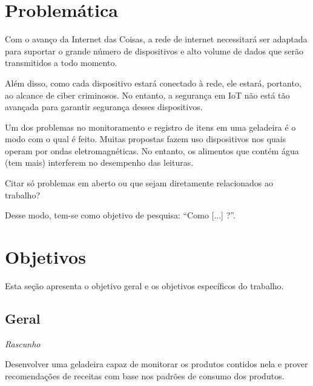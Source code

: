 \section{Problemática}

Com o avanço da Internet das Coisas, a rede de internet necessitará ser adaptada para suportar o grande número de dispositivos e alto volume de dados que serão transmitidos a todo momento.

Além disso, como cada dispositivo estará conectado à rede, ele estará, portanto, ao alcance de ciber criminosos. No entanto, a segurança em IoT não está tão avançada para garantir segurança desses dispositivos.

Um dos problemas no monitoramento e registro de itens em uma geladeira é o modo com o qual é feito. Muitas propostas fazem uso dispositivos nos quais operam por ondas eletromagnéticas. No entanto, os alimentos que contém água (tem mais) interferem no desempenho das leituras.

Citar só problemas em aberto ou que sejam diretamente relacionados ao trabalho?


Desse modo, tem-se como objetivo de pesquisa: ``Como [...] ?''.

\section{Objetivos}
Esta seção apresenta o objetivo geral e os objetivos específicos do trabalho.

\subsection{Geral}

\textit{Rascunho}

Desenvolver uma geladeira capaz de monitorar os produtos contidos nela e prover recomendações de receitas com base nos padrões de consumo dos produtos.

